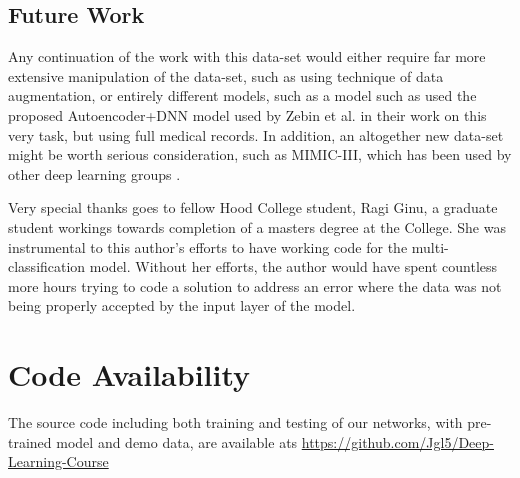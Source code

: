 \documentclass[sigconf,authorversion]{acmart}
\begin{document}
\subsection{Future Work}
Any continuation of the work  with this data-set would either require far more extensive manipulation of the data-set, such as using technique of data augmentation, or entirely different models, such as a model such as used the proposed Autoencoder+DNN model used by Zebin et al. \cite{8791477} in their work on this very task, but using full medical records. In addition, an altogether new data-set might be worth serious consideration, such as MIMIC-III, which has been used by other deep learning groups \cite{johnson2016mimic}.
%
\begin{acks}
Very special thanks goes to fellow Hood College student, Ragi Ginu, a graduate student workings towards completion of a masters degree at the College. She was instrumental to this author's efforts to have working code for the multi-classification model. Without her efforts, the author would have spent countless more hours trying to code a solution to address an error where the data was not being properly accepted by the input layer of the model.
\end{acks}

\section*{Code Availability}
The source code including both training and testing of our networks, with pre-trained
model and demo data, are available ats
\url{https://github.com/Jgl5/Deep-Learning-Course}



\end{document}
